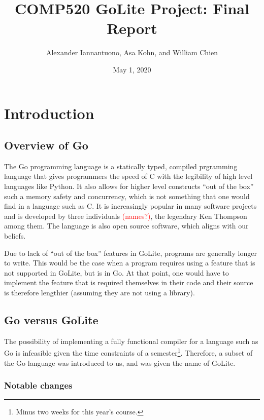 \documentclass{article}
\title{COMP520 GoLite Project: Final Report}
\author{Alexander Iannantuono, Asa Kohn, and William Chien}
\date{May 1, 2020}
\begin{document}
\maketitle

\section{Introduction}

\subsection{Overview of Go}

The Go programming language is a statically typed, compiled prgramming language that gives programmers the speed of C with the legibility of high level languages like Python. It also allows for higher level constructs ``out of the box'' such a memory safety and concurrency, which is not something that one would find in a language such as C. It is increasingly popular in many software projects and is developed by three individuals \textcolor{red}{(names?)}, the legendary Ken Thompson among them. The language is also open source software, which aligns with our beliefs.

Due to lack of ``out of the box'' features in GoLite, programs are generally longer to write. This would be the case when a program requires
using a feature that is not supported in GoLite, but is in Go. At that point, one would have to implement the feature that is required themselves in their code and their source is therefore lengthier (assuming they are not using a library).


\subsection{Go versus GoLite}

The possibility of implementing a fully functional compiler for a language such as Go is infeasible given the time constraints of a semester\footnote{Minus two weeks for this year's course.}. Therefore, a subset of the Go language was introduced to us, and was given the name of GoLite.

\subsubsection{Notable changes}
\end{document}
